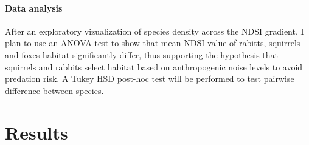 \documentclass{article}
\begin{document}
\paragraph{Data analysis}
After an exploratory vizualization of species density across the NDSI gradient, I plan to use an ANOVA test to show that mean NDSI value of rabitts, squirrels and foxes habitat significantly differ, thus supporting the hypothesis that squirrels and rabbits select habitat based on anthropogenic noise levels to avoid predation risk. A Tukey HSD post-hoc test will be performed to test pairwise difference between species.

\section{Results}




\end{document}
